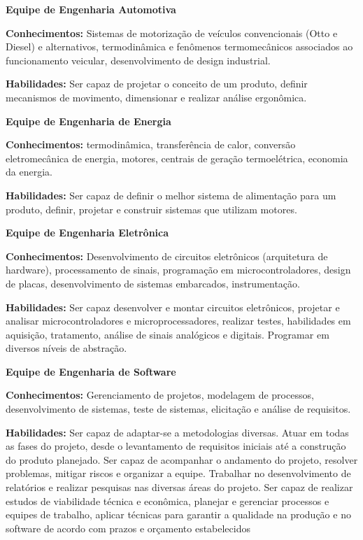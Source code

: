 \textbf{Equipe de Engenharia Automotiva}

\textbf{Conhecimentos:} Sistemas de motorização de veículos convencionais (Otto e Diesel) e alternativos, termodinâmica e fenômenos termomecânicos associados ao funcionamento veicular,
desenvolvimento de design industrial.

\textbf{Habilidades:} Ser capaz de projetar o conceito de um produto, definir mecanismos de movimento, dimensionar e realizar análise ergonômica.


\textbf{Equipe de Engenharia de Energia}

\textbf{Conhecimentos:} termodinâmica, transferência de calor, conversão eletromecânica de energia, motores, centrais de geração termoelétrica, economia da energia.

\textbf{Habilidades:} Ser capaz de definir o melhor sistema de alimentação para um produto, definir, projetar e construir sistemas que utilizam motores. 


\textbf{Equipe de Engenharia Eletrônica}

\textbf{Conhecimentos:} Desenvolvimento de circuitos eletrônicos (arquitetura de hardware), processamento de sinais, programação em microcontroladores, design de placas, desenvolvimento de sistemas embarcados, instrumentação. 

\textbf{Habilidades:} Ser capaz desenvolver e montar circuitos eletrônicos, projetar e analisar microcontroladores e microprocessadores, realizar testes, habilidades em aquisição, tratamento, análise de sinais analógicos e digitais. Programar em diversos níveis de abstração.


\textbf{Equipe de Engenharia de Software}

\textbf{Conhecimentos:} Gerenciamento de projetos, modelagem de processos, desenvolvimento de sistemas,  teste de sistemas, elicitação e análise de requisitos.

\textbf{Habilidades:} Ser capaz de adaptar-se a metodologias diversas. Atuar em todas as fases do projeto, desde o levantamento de requisitos iniciais até a construção do produto planejado. Ser capaz de acompanhar o andamento do projeto, resolver problemas, mitigar riscos e organizar a equipe. Trabalhar no desenvolvimento de relatórios e realizar pesquisas nas diversas áreas do projeto. Ser capaz de realizar estudos de viabilidade técnica e econômica, planejar e gerenciar processos e equipes de trabalho, aplicar técnicas para garantir a qualidade na produção e no software de acordo com prazos e orçamento estabelecidos

